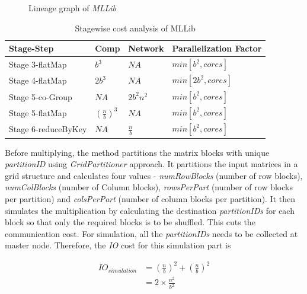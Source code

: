 \begin{figure}
\begin{tikzpicture}
	\end{tikzpicture}		
	\caption{Lineage graph of \textit{MLLib}}
	\label{fig:mllib-lineage}
\end{figure}

\begin{table}[h!]
	\caption{Stagewise cost analysis of MLLib}
	\label{tab:mllibCost}
	\begin{minipage}{\columnwidth}
		\begin{center}
			\begin{tabular}{llll}
				\toprule
				Stage-Step & Comp & Network & Parallelization Factor \\
				\toprule
				Stage 3-flatMap & $b^{3}$ & $NA$ & $min[b^{2}, cores]$ \\
				Stage 4-flatMap & $2b^{3}$ & $NA$ & $min[2b^{2}, cores]$ \\
				Stage 5-co-Group & $NA$ & $2b^{2}n^{2}$ & $min[b^{2}, cores]$ \\
				Stage 5-flatMap & $(\frac{n}{b})^{3}$ & $NA$ & $min[b^{2}, cores]$ \\
				Stage 6-reduceByKey & $NA$ & $\frac{n}{b}$ & $min[b^{2}, cores]$ \\
				\bottomrule
			\end{tabular}
		\end{center}
	\end{minipage}
\end{table}

Before multiplying, the method partitions the matrix blocks with unique \textit{partitionID} using \textit{GridPartitioner} approach. It partitions the input matrices in a grid structure and calculates four values - \textit{numRowBlocks} (number of row blocks), \textit{numColBlocks} (number of Column blocks), \textit{rowsPerPart} (number of row blocks per partition) and \textit{colsPerPart} (number of column blocks per partition). It then simulates the multiplication by calculating the destination \textit{partitionIDs} for each block so that only the required blocks is to be shuffled. This cuts the communication cost. For simulation, all the \textit{partitionIDs} needs to be collected at master node. Therefore, the \textit{IO} cost for this simulation part is

\begin{equation}
\begin{aligned}
IO_{simulation}&=(\frac{n}{b})^{2} + (\frac{n}{b})^{2}\\
&=2\times \frac{n^{2}}{b^{2}}
\end{aligned}
\end{equation}

